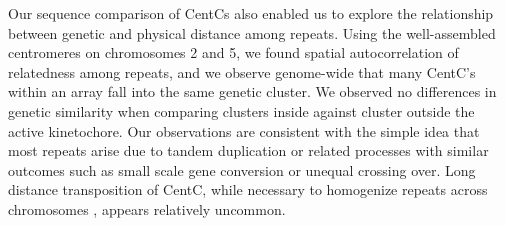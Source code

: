 

Our sequence comparison of CentCs also enabled us to explore the relationship between genetic and physical distance among repeats.  
Using the well-assembled centromeres on chromosomes 2 and 5, we found spatial autocorrelation of relatedness among repeats, and we observe genome-wide that many CentC’s within an array fall into the same genetic cluster.
We observed no differences in genetic similarity when comparing clusters inside against cluster outside the active kinetochore.
Our observations are consistent with the simple idea that most repeats arise due to tandem duplication or related processes with similar outcomes such as small scale gene conversion or unequal crossing over.
Long distance transposition of CentC, while necessary to homogenize repeats across chromosomes \citep{Shi2010}, appears relatively uncommon.

